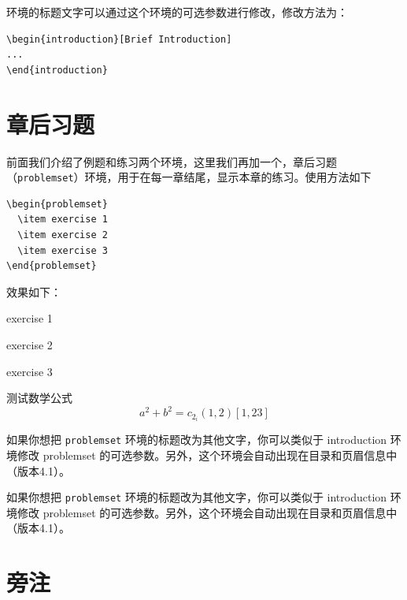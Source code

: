\documentclass[lang=cn,newtx,10pt,scheme=chinese]{elegantbook}
\begin{document}
环境的标题文字可以通过这个环境的可选参数进行修改，修改方法为：
\begin{lstlisting}
\begin{introduction}[Brief Introduction]
...
\end{introduction}
\end{lstlisting}

\section{章后习题}
前面我们介绍了例题和练习两个环境，这里我们再加一个，章后习题（\lstinline{problemset}）环境，用于在每一章结尾，显示本章的练习。使用方法如下

\begin{lstlisting}
\begin{problemset}
  \item exercise 1
  \item exercise 2
  \item exercise 3
\end{problemset}
\end{lstlisting}


效果如下：
\begin{problemset}[我的题目]
  \item exercise 1
  \item exercise 2
  \item exercise 3
  \item 测试数学公式
  \begin{equation}
    a^2+b^2=c_{2_{i}} (1,2) [1,23]
  \end{equation}
\end{problemset}

\begin{remark}
如果你想把 \lstinline{problemset} 环境的标题改为其他文字，你可以类似于 introduction 环境修改 problemset 的可选参数。另外，这个环境会自动出现在目录和页眉信息中（版本4.1）。
\end{remark}

\begin{solution}
如果你想把 \lstinline{problemset} 环境的标题改为其他文字，你可以类似于 introduction 环境修改 problemset 的可选参数。另外，这个环境会自动出现在目录和页眉信息中（版本4.1）。
\end{solution}

\section{旁注}
\end{document}
